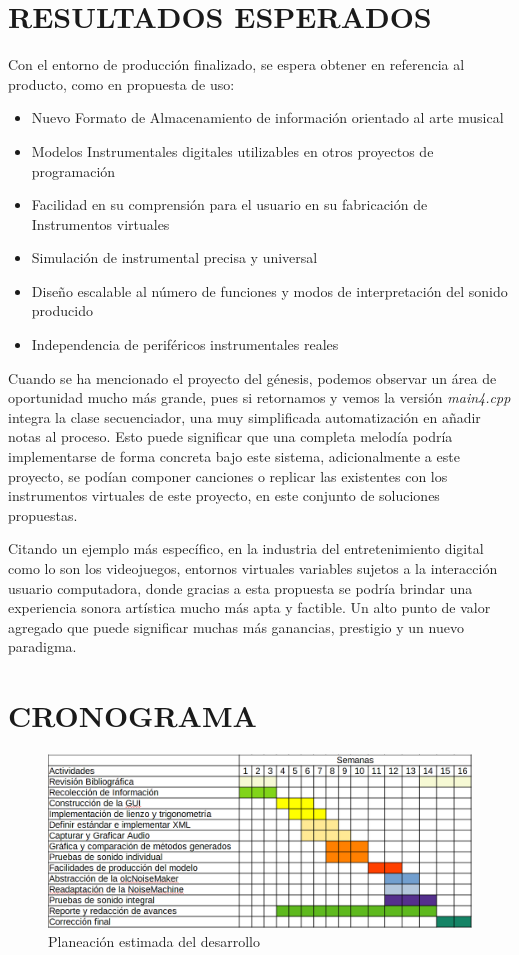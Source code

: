 \documentclass{book}
\begin{document}
	\section*{RESULTADOS ESPERADOS}
	Con el entorno de producción finalizado, se espera obtener en referencia al producto, como en propuesta de uso:
	\begin{itemize}
		\item Nuevo Formato de Almacenamiento de información orientado al arte musical
		\item Modelos Instrumentales digitales utilizables en otros proyectos de programación
		\item Facilidad en su comprensión para el usuario en su fabricación de Instrumentos virtuales
		\item Simulación de instrumental precisa y universal
		\item Diseño escalable al número de funciones y modos de interpretación del sonido producido
		\item Independencia de periféricos instrumentales reales
	\end{itemize}
	Cuando se ha mencionado el proyecto del génesis, podemos observar un área de oportunidad mucho más grande, pues si retornamos y vemos la versión \emph{main4.cpp} integra la clase secuenciador, una muy simplificada automatización en añadir notas al proceso. Esto puede significar que una completa melodía podría implementarse de forma concreta bajo este sistema, adicionalmente a este proyecto, se podían componer canciones o replicar las existentes con los instrumentos virtuales de este proyecto, en este conjunto de soluciones propuestas.\pagebreak\par
	
	Citando un ejemplo más específico, en la industria del entretenimiento digital como lo son los videojuegos, entornos virtuales variables sujetos a la interacción usuario computadora, donde gracias a esta propuesta se podría brindar una experiencia sonora artística mucho más apta y factible. Un alto punto de valor agregado que puede significar muchas más ganancias, prestigio y un nuevo paradigma.\par
	
	\section*{CRONOGRAMA}
	\begin{figure}[h]
		\includegraphics[width=\linewidth]{../Assets/images/cronograma}
		\caption{Planeación estimada del desarrollo}
	\end{figure} 
\end{document}
